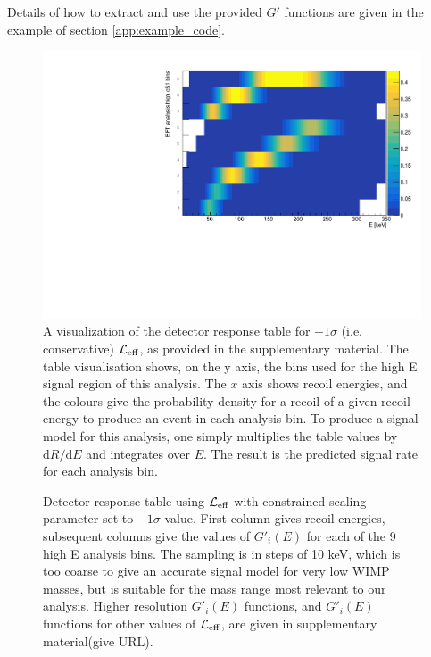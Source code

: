 Details of how to extract and use the provided $G'$ functions are given in the example of section \ref{app:example_code}. 

\begin{figure}
\centerline{\includegraphics[width=1.\linewidth]{Figures/smeartable_highE}}
\caption{A visualization of the detector response table for $-1\sigma$ (i.e. conservative) $\mathcal{L}_{\mathrm{eff}}$, as provided in the supplementary material. The table visualisation shows, on the y axis, the bins used for the high E signal region of this analysis. The $x$ axis shows recoil energies, and the colours give the probability density for a recoil of a given recoil energy to produce an event in each analysis bin. To produce a signal model for this analysis, one simply multiplies the table values by $\mathrm{d}R/\mathrm{d}E$ and integrates over $E$. The result is the predicted signal rate for each analysis bin.}
\label{fig:smeartable_highE}
\end{figure}  

\begin{figure}
{

  \lstset{tabsize=4,basicstyle=\tiny\ttfamily,columns=flexible,emptylines=10000}
  
}
\caption{Detector response table using $\mathcal{L}_{\mathrm{eff}}$ with constrained scaling parameter set to $-1\sigma$ value. First column gives recoil energies, subsequent columns give the values of $G'_i(E)$ for each of the 9 high E analysis bins. The sampling is in steps of 10 keV, which is too coarse to give an accurate signal model for very low WIMP masses, but is suitable for the mass range most relevant to our analysis. Higher resolution $G'_i(E)$ functions, and $G'_i(E)$ functions for other values of $\mathcal{L}_{\mathrm{eff}}$, are given in supplementary material\BenComment(give URL). 
\label{tab:smeartable_highE}
}
\end{figure}  
\newpage
